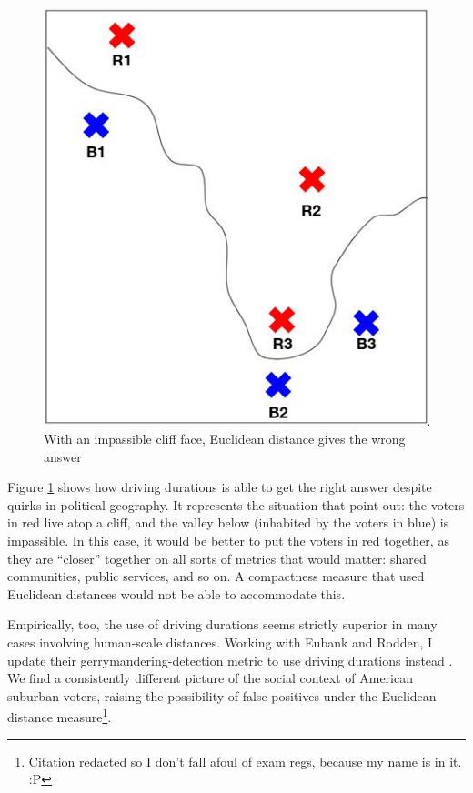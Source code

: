 \documentclass[]{article}
\begin{document}
\begin{figure}
\centering
\includegraphics{./img/hc_impassable.jpg}
\caption{With an impassible cliff face, Euclidean distance gives the
wrong answer \label{hc_impassible}}
\end{figure}

Figure \ref{hc_impassible} shows how driving durations is able to get
the right answer despite quirks in political geography. It represents
the situation that \cite{fh2011} point out: the voters in red live atop
a cliff, and the valley below (inhabited by the voters in blue) is
impassible. In this case, it would be better to put the voters in red
together, as they are ``closer'' together on all sorts of metrics that
would matter: shared communities, public services, and so on. A
compactness measure that used Euclidean distances would not be able to
accommodate this.

Empirically, too, the use of driving durations seems strictly superior
in many cases involving human-scale distances. Working with Eubank and
Rodden, I update their gerrymandering-detection metric to use driving
durations instead \citep{er2019}. We find a consistently different
picture of the social context of American suburban voters, raising the
possibility of false positives under the Euclidean distance
measure\footnote{Citation redacted so I don't fall afoul of exam regs,
  because my name is in it. :P}.
\end{document}
